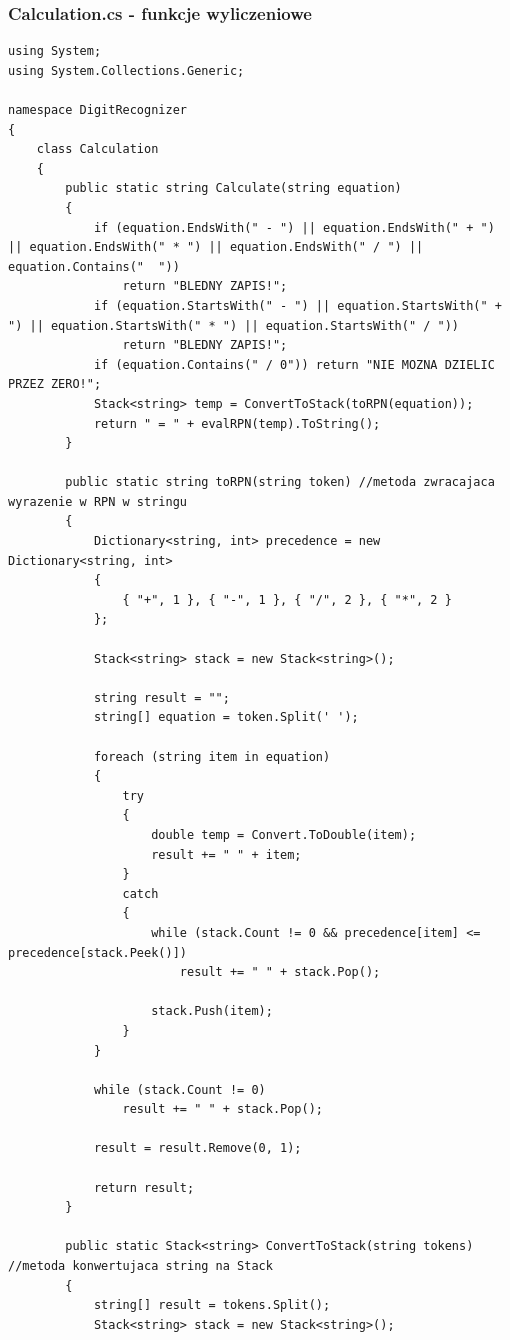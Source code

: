 \documentclass[12pt,a4paper]{article}
\begin{document}
\vspace{20pt}	
	\subsubsection*{Calculation.cs - funkcje wyliczeniowe}
	\begin{lstlisting}
using System;
using System.Collections.Generic;

namespace DigitRecognizer
{
    class Calculation
    {
        public static string Calculate(string equation)
        {
            if (equation.EndsWith(" - ") || equation.EndsWith(" + ") || equation.EndsWith(" * ") || equation.EndsWith(" / ") || equation.Contains("  "))
                return "BLEDNY ZAPIS!";
            if (equation.StartsWith(" - ") || equation.StartsWith(" + ") || equation.StartsWith(" * ") || equation.StartsWith(" / "))
                return "BLEDNY ZAPIS!";
            if (equation.Contains(" / 0")) return "NIE MOZNA DZIELIC PRZEZ ZERO!";
            Stack<string> temp = ConvertToStack(toRPN(equation));
            return " = " + evalRPN(temp).ToString();
        }

        public static string toRPN(string token) //metoda zwracajaca wyrazenie w RPN w stringu
        {
            Dictionary<string, int> precedence = new Dictionary<string, int>
            {
                { "+", 1 }, { "-", 1 }, { "/", 2 }, { "*", 2 }
            };

            Stack<string> stack = new Stack<string>();

            string result = "";
            string[] equation = token.Split(' ');

            foreach (string item in equation)
            {
                try
                {
                    double temp = Convert.ToDouble(item);
                    result += " " + item;
                }
                catch
                {
                    while (stack.Count != 0 && precedence[item] <= precedence[stack.Peek()])
                        result += " " + stack.Pop();

                    stack.Push(item);
                }
            }

            while (stack.Count != 0)
                result += " " + stack.Pop();

            result = result.Remove(0, 1);

            return result;
        }

        public static Stack<string> ConvertToStack(string tokens) //metoda konwertujaca string na Stack
        {
            string[] result = tokens.Split();
            Stack<string> stack = new Stack<string>();


\end{lstlisting}
\end{document}
